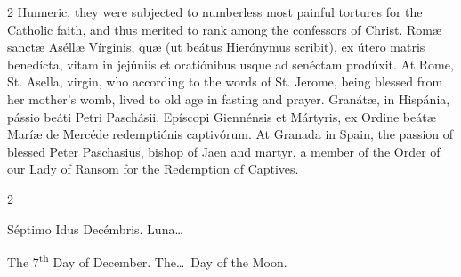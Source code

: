 \begin{paracol}{2}
 Hunneric, they were subjected to numberless most painful tortures for the 
 Catholic faith, and thus merited to rank among the confessors of Christ.
\switchcolumn*
{}
Romæ sanctæ Aséllæ 
 Vírginis, quæ (ut beátus Hierónymus scribit), ex útero matris benedícta, 
 vitam in jejúniis et oratiónibus usque ad senéctam prodúxit.
\switchcolumn
{}
At Rome, St. Asella, virgin, who 
 according to the words of St. Jerome, being blessed from her mother's womb, 
 lived to old age in fasting and prayer.
\switchcolumn*
{}
Granátæ, in Hispánia, 
 pássio beáti Petri Paschásii, Epíscopi Giennénsis et Mártyris, ex Ordine 
 beátæ Maríæ de Mercéde redemptiónis captivórum.
\switchcolumn
{}
At Granada in Spain, the passion of 
 blessed Peter Paschasius, bishop of Jaen and martyr, a member of the Order 
 of our Lady of Ransom for the Redemption of Captives.
\switchcolumn*
{}
\end{paracol}


\begin{paracol}{2}
\begin{center}{\color{gregoriocolor} Séptimo Idus Decémbris. 
 Luna\dots\ }\end{center}
\switchcolumn
{}
\begin{center}{\color{gregoriocolor} The 
 7\textsuperscript{th} Day of 
 December. The\dots\ Day of the Moon.}\end{center}
\end{paracol}

